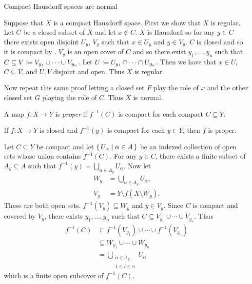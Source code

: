 \documentclass[letterpaper, 11pt]{article}
\begin{document}
\begin{thrm}
  Compact Hausdorff spaces are normal
\end{thrm}
\begin{pf}
  Suppose that $X$ is a compact Hausdorff space.
  First we show that $X$ is regular.
  Let $C$ be a closed subset of $X$ and let $x \notin C$.
  $X$ is Hausdorff so for any $y \in C$ there exists open disjoint $U_{y}$, $V_{y}$ such that $x \in U_{y}$ and $y \in V_{y}$.
  $C$ is closed and so it is compact by .
  $V_{y}$ is an open cover of $C$ and so there exist $y_{1}, \ldots, y_{n}$ such that $C \subseteq V \coloneqq V_{y_{1}} \cup \cdots \cup V_{y_{n}}$.
  Let $U \coloneqq U_{y_{1}} \cap \cdots \cap U_{y_{n}}$.
  Then we have that $x \in U$, $C \subseteq V$, and $U, V$ disjoint and open.
  Thus $X$ is regular.

  Now repeat this same proof letting a closed set $F$ play the role of $x$ and the other closed set $G$ playing the role of $C$.
  Thus $X$ is normal.
\end{pf}

\begin{defn}
  A map $f\colon X \to Y$ is \emph{proper} if $f^{-1}(C)$ is compact for each compact $C \subseteq Y$.
\end{defn}

\clearpage

\begin{thrm}\label{thrm: closed_single_point_preimage_compact}
  If $f\colon X \to Y$ is closed and $f^{-1}(y)$ is compact for each $y \in Y$, then $f$ is proper.
\end{thrm}
\begin{pf}
  Let $C \subseteq Y$ be compact and let $\set{U_{\alpha} | \alpha \in A}$ be an indexed collection of open sets whose union contains $f^{-1}(C)$.
  For any $y \in C$, there exists a finite subset of $A_{y} \subseteq A$ such that $f^{-1}(y) = \bigcup_{\alpha \in A_{y}} U_{\alpha}$.
  Now let
  \begin{align*}
    W_{y} &= \bigcup_{\alpha \in A_{y}} U_{\alpha}, \\
    V_{y} &= Y \setminus f(X \setminus W_{y}).
  \end{align*}
  These are both open sets.
  $f^{-1}(V_{y}) \subseteq W_{y}$ and $y \in V_{y}$.
  Since $C$ is compact and covered by $V_{y}$, there exists $y_{1}, \ldots, y_{n}$ such that $C \subseteq V_{y_{1}} \cup \cdots \cup V_{y_{n}}$.
  Thus
  \begin{align*}
    f^{-1}(C) &\subseteq f^{-1}(V_{y_{1}}) \cup \cdots \cup f^{-1}(V_{y_{n}}) \\
              &\subseteq W_{y_{1}} \cup \cdots \cup W_{y_{n}} \\
              &= \bigcup_{\substack{\alpha \in A_{y_{i}} \\ 1 \leq i \leq n}} U_{\alpha}
  \end{align*}
  which is a finite open subcover of $f^{-1}(C)$.
\end{pf}
\end{document}
